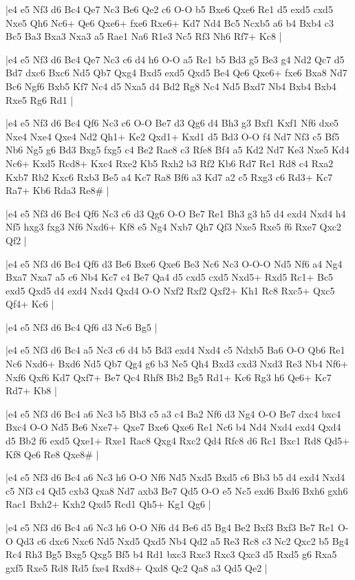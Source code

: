 \whitename{}
\blackname{}
\makegametitle
|e4 e5 Nf3 d6 Bc4 Qe7 Nc3 Be6 Qe2 c6 O-O b5 Bxe6 Qxe6 Re1 d5 exd5 cxd5 Nxe5 Qh6 Nc6+ Qe6 Qxe6+ fxe6 Rxe6+ Kd7 Nd4 Bc5 Ncxb5 a6 b4 Bxb4 c3 Bc5 Ba3 Bxa3 Nxa3 a5 Rae1 Na6 R1e3 Nc5 Rf3 Nh6 Rf7+ Kc8  |

\whitename{}
\blackname{}
\makegametitle
|e4 e5 Nf3 d6 Bc4 Qe7 Nc3 c6 d4 h6 O-O a5 Re1 b5 Bd3 g5 Be3 g4 Nd2 Qc7 d5 Bd7 dxc6 Bxc6 Nd5 Qb7 Qxg4 Bxd5 exd5 Qxd5 Be4 Qe6 Qxe6+ fxe6 Bxa8 Nd7 Bc6 Ngf6 Bxb5 Kf7 Nc4 d5 Nxa5 d4 Bd2 Rg8 Nc4 Nd5 Bxd7 Nb4 Bxb4 Bxb4 Rxe5 Rg6 Rd1  |

\whitename{}
\blackname{}
\makegametitle
|e4 e5 Nf3 d6 Bc4 Qf6 Nc3 c6 O-O Be7 d3 Qg6 d4 Bh3 g3 Bxf1 Kxf1 Nf6 dxe5 Nxe4 Nxe4 Qxe4 Nd2 Qh1+ Ke2 Qxd1+ Kxd1 d5 Bd3 O-O f4 Nd7 Nf3 c5 Bf5 Nb6 Ng5 g6 Bd3 Bxg5 fxg5 c4 Be2 Rac8 c3 Rfe8 Bf4 a5 Kd2 Nd7 Ke3 Nxe5 Kd4 Nc6+ Kxd5 Rcd8+ Kxc4 Rxe2 Kb5 Rxh2 b3 Rf2 Kb6 Rd7 Re1 Rd8 c4 Rxa2 Kxb7 Rb2 Kxc6 Rxb3 Be5 a4 Kc7 Ra8 Bf6 a3 Kd7 a2 c5 Rxg3 c6 Rd3+ Kc7 Ra7+ Kb6 Rda3 Re8\#  |

\whitename{}
\blackname{}
\makegametitle
|e4 e5 Nf3 d6 Bc4 Qf6 Nc3 c6 d3 Qg6 O-O Be7 Re1 Bh3 g3 h5 d4 exd4 Nxd4 h4 Nf5 hxg3 fxg3 Nf6 Nxd6+ Kf8 e5 Ng4 Nxb7 Qh7 Qf3 Nxe5 Rxe5 f6 Rxe7 Qxc2 Qf2  |

\whitename{}
\blackname{}
\makegametitle
|e4 e5 Nf3 d6 Bc4 Qf6 d3 Be6 Bxe6 Qxe6 Be3 Nc6 Nc3 O-O-O Nd5 Nf6 a4 Ng4 Bxa7 Nxa7 a5 c6 Nb4 Kc7 c4 Be7 Qa4 d5 cxd5 cxd5 Nxd5+ Rxd5 Rc1+ Bc5 exd5 Qxd5 d4 exd4 Nxd4 Qxd4 O-O Nxf2 Rxf2 Qxf2+ Kh1 Rc8 Rxc5+ Qxc5 Qf4+ Kc6  |

\whitename{}
\blackname{}
\makegametitle
|e4 e5 Nf3 d6 Bc4 Qf6 d3 Nc6 Bg5  |

\whitename{}
\blackname{}
\makegametitle
|e4 e5 Nf3 d6 Bc4 a5 Nc3 c6 d4 b5 Bd3 exd4 Nxd4 c5 Ndxb5 Ba6 O-O Qb6 Re1 Nc6 Nxd6+ Bxd6 Nd5 Qb7 Qg4 g6 b3 Ne5 Qh4 Bxd3 cxd3 Nxd3 Re3 Nb4 Nf6+ Nxf6 Qxf6 Kd7 Qxf7+ Be7 Qc4 Rhf8 Bb2 Bg5 Rd1+ Kc6 Rg3 h6 Qe6+ Kc7 Rd7+ Kb8  |

\whitename{}
\blackname{}
\makegametitle
|e4 e5 Nf3 d6 Bc4 a6 Nc3 b5 Bb3 c5 a3 c4 Ba2 Nf6 d3 Ng4 O-O Be7 dxc4 bxc4 Bxc4 O-O Nd5 Be6 Nxe7+ Qxe7 Bxe6 Qxe6 Re1 Nc6 b4 Nd4 Nxd4 exd4 Qxd4 d5 Bb2 f6 exd5 Qxe1+ Rxe1 Rac8 Qxg4 Rxc2 Qd4 Rfc8 d6 Rc1 Bxc1 Rd8 Qd5+ Kf8 Qe6 Re8 Qxe8\#  |

\whitename{}
\blackname{}
\makegametitle
|e4 e5 Nf3 d6 Bc4 a6 Nc3 h6 O-O Nf6 Nd5 Nxd5 Bxd5 c6 Bb3 b5 d4 exd4 Nxd4 c5 Nf3 c4 Qd5 cxb3 Qxa8 Nd7 axb3 Be7 Qd5 O-O e5 Nc5 exd6 Bxd6 Bxh6 gxh6 Rac1 Bxh2+ Kxh2 Qxd5 Rcd1 Qh5+ Kg1 Qg6  |

\whitename{}
\blackname{}
\makegametitle
|e4 e5 Nf3 d6 Bc4 a6 Nc3 h6 O-O Nf6 d4 Be6 d5 Bg4 Be2 Bxf3 Bxf3 Be7 Re1 O-O Qd3 c6 dxc6 Nxc6 Nd5 Nxd5 Qxd5 Nb4 Qd2 a5 Re3 Rc8 c3 Nc2 Qxc2 b5 Bg4 Rc4 Rh3 Bg5 Bxg5 Qxg5 Bf5 b4 Rd1 bxc3 Rxc3 Rxc3 Qxc3 d5 Rxd5 g6 Rxa5 gxf5 Rxe5 Rd8 Rd5 fxe4 Rxd8+ Qxd8 Qc2 Qa8 a3 Qd5 Qe2  |

